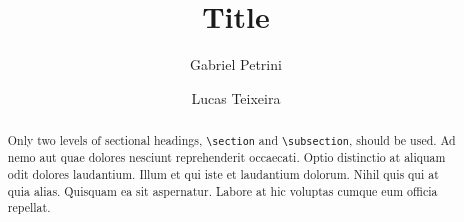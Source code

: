 %




\usepackage{graphicx}
\usepackage[T1]{fontenc}
\usepackage[utf8]{inputenc}%
\usepackage[american]{babel}
\usepackage{setspace}
\usepackage{float}
\usepackage{amssymb}
\usepackage{amsmath}%
\usepackage{mathptmx}%
\usepackage{url}
\usepackage{caption}
\usepackage{indentfirst}
\usepackage{csquotes}
\usepackage{lipsum}
\usepackage[titletoc,title]{appendix}
\usepackage{tikz}
\usetikzlibrary{through,calc}
\usepackage{epstopdf}%


\title{Title}

\author[1]{Gabriel Petrini}
\author[2]{Lucas Teixeira}




	
	\maketitle
	
	\begin{abstract}
		Only two levels of sectional headings, \verb|\section| and \verb|\subsection|, should be used. Ad nemo aut quae dolores nesciunt reprehenderit occaecati. Optio distinctio at aliquam odit dolores laudantium. Illum et qui iste et laudantium dolorum. Nihil quis qui at quia alias. Quisquam ea sit aspernatur. Labore at hic voluptas cumque eum officia repellat.
		
	\end{abstract}

	
